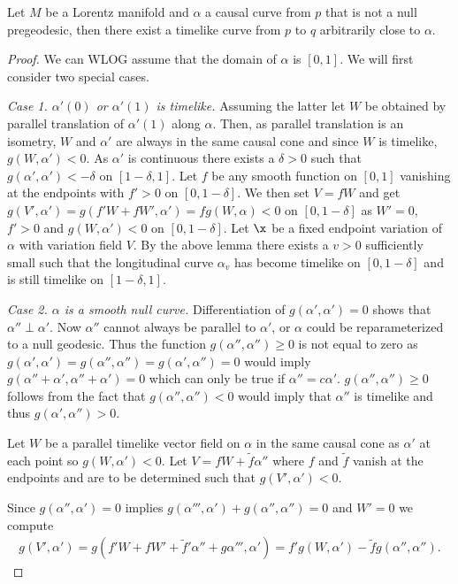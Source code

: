 \begin{proposition}\label{prop:geosmoothing}
Let $M$ be a Lorentz manifold and $\alpha$ a causal curve from $p$ that is not a null pregeodesic, then there exist a timelike curve from $p$ to $q$ arbitrarily close to $\alpha$.
\end{proposition}
\begin{proof}
We can WLOG assume that the domain of $\alpha$ is $[0,1]$. We will first consider two special cases.

\emph{Case 1. $\alpha'(0)$ or $\alpha'(1)$ is timelike.} Assuming the latter let $W$ be obtained by parallel translation of $\alpha'(1)$ along $\alpha$. Then, as parallel translation is an isometry, $W$ and $\alpha'$ are always in the same causal cone and since $W$ is timelike, $g(W,\alpha')<0$. As $\alpha'$ is continuous there exists a $\delta>0$ such that $g(\alpha',\alpha') < -\delta$ on $[1-\delta,1]$. Let $f$ be any smooth function on $[0,1]$ vanishing at the endpoints with $f'>0$ on $[0,1-\delta]$. We then set $V = fW$ and get $g(V',\alpha') = g(f'W + fW',\alpha') = fg(W,\alpha) < 0$ on $[0,1-\delta]$ as $W'=0$, $f'>0$ and $g(W,\alpha')<0$ on $[0,1-\delta]$. Let $\x$ be a fixed endpoint variation of $\alpha$ with variation field $V$. By the above lemma there exists a $v>0$ sufficiently small such that the longitudinal curve $\alpha_v$ has become timelike on $[0,1-\delta]$ and is still timelike on $[1-\delta,1]$.

\emph{Case 2. $\alpha$ is a smooth null curve.}
Differentiation of $g(\alpha',\alpha')=0$ shows that $\alpha''\perp\alpha'$. Now $\alpha''$ cannot always be parallel to $\alpha'$, or $\alpha$ could be reparameterized to a null geodesic. Thus the function $g(\alpha'',\alpha'')\geq 0$ is not equal to zero as $g(\alpha',\alpha') = g(\alpha'',\alpha'') = g(\alpha',\alpha'') = 0$ would imply $g(\alpha''+\alpha',\alpha''+\alpha')=0$ which can only be true if $\alpha''=c\alpha'$. $g(\alpha'',\alpha'') \geq 0$ follows from the fact that $g(\alpha'',\alpha'') < 0$ would imply that $\alpha''$ is timelike and thus $g(\alpha',\alpha'')>0$.

Let $W$ be a parallel timelike vector field on $\alpha$ in the same causal cone as $\alpha'$ at each point so $g(W,\alpha')<0$. Let $V=fW+\widetilde{f}\alpha''$ where $f$ and $\widetilde{f}$ vanish at the endpoints and are to be determined such that $g(V',\alpha')<0$.

Since $g(\alpha'',\alpha')=0$ implies $g(\alpha''',\alpha')+g(\alpha'',\alpha'')=0$ and $W'=0$ we compute 
\begin{align*}
    g(V',\alpha') = g(f'W+fW'+\widetilde{f}'\alpha''+g\alpha''',\alpha') = f'g(W,\alpha') - \widetilde{f}g(\alpha'',\alpha'').
\end{align*}


\end{proof}
